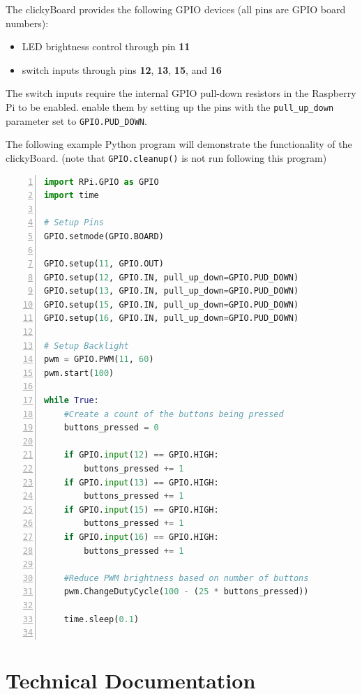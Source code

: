\documentclass[10pt, a4paper, onesided]{article}
\begin{document}
The clickyBoard provides the following GPIO devices (all pins are GPIO board numbers):

\begin{itemize}[nosep]
	\item LED brightness control through pin \textbf{11}
	\item switch inputs through pins \textbf{12}, \textbf{13}, \textbf{15}, and \textbf{16}
\end{itemize}

The switch inputs require the internal GPIO pull-down resistors in the Raspberry Pi to be enabled. enable them by setting up the pins with the \texttt{pull\_up\_down} parameter set to \texttt{GPIO.PUD\_DOWN}.

The following example Python program will demonstrate the functionality of the clickyBoard. (note that \texttt{GPIO.cleanup()} is not run following this program)

\begin{lstlisting}[language=Python,title=clickyboardtest.py,numbers=left]
import RPi.GPIO as GPIO
import time

# Setup Pins
GPIO.setmode(GPIO.BOARD)

GPIO.setup(11, GPIO.OUT)
GPIO.setup(12, GPIO.IN, pull_up_down=GPIO.PUD_DOWN)
GPIO.setup(13, GPIO.IN, pull_up_down=GPIO.PUD_DOWN)
GPIO.setup(15, GPIO.IN, pull_up_down=GPIO.PUD_DOWN)
GPIO.setup(16, GPIO.IN, pull_up_down=GPIO.PUD_DOWN)

# Setup Backlight
pwm = GPIO.PWM(11, 60)
pwm.start(100)

while True:
	#Create a count of the buttons being pressed
	buttons_pressed = 0
	
	if GPIO.input(12) == GPIO.HIGH:
		buttons_pressed += 1
	if GPIO.input(13) == GPIO.HIGH:
		buttons_pressed += 1
	if GPIO.input(15) == GPIO.HIGH:
		buttons_pressed += 1
	if GPIO.input(16) == GPIO.HIGH:
		buttons_pressed += 1
	
	#Reduce PWM brightness based on number of buttons
	pwm.ChangeDutyCycle(100 - (25 * buttons_pressed))
	
	time.sleep(0.1)
	
\end{lstlisting}

\newpage
\section{Technical Documentation}
\end{document}
